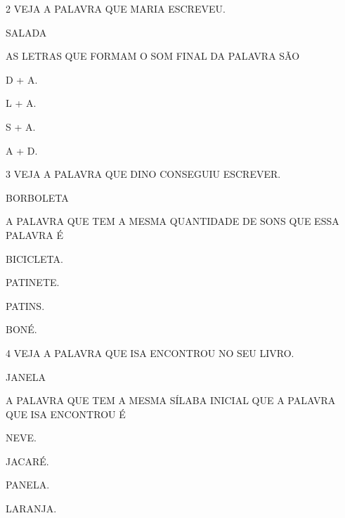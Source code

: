 \num{2} VEJA A PALAVRA QUE MARIA ESCREVEU.

\begin{myquote}
\centering\large{SALADA}
\end{myquote}

AS LETRAS QUE FORMAM O SOM FINAL DA PALAVRA SÃO

\begin{multicols}{2}
\begin{escolha}
\item D + A.

\item L + A.

\item S + A.

\item A + D.
\end{escolha}
\end{multicols}

\num{3} VEJA A PALAVRA QUE DINO CONSEGUIU ESCREVER.

\begin{myquote}
\centering\large{BORBOLETA}
\end{myquote}

A PALAVRA QUE TEM A MESMA QUANTIDADE DE SONS QUE ESSA PALAVRA É 

\begin{multicols}{2}
\begin{escolha}%
\item BICICLETA.

\item PATINETE.

\item PATINS.

\item BONÉ.
\end{escolha}
\end{multicols}

\num{4} VEJA A PALAVRA QUE ISA ENCONTROU NO SEU LIVRO. 

\begin{myquote}
\centering\large{JANELA}
\end{myquote}

A PALAVRA QUE TEM A MESMA SÍLABA INICIAL QUE A PALAVRA QUE ISA ENCONTROU É

\begin{multicols}{2}
\begin{escolha}%
\item NEVE.

\item JACARÉ.

\item PANELA.

\item LARANJA.
\end{escolha}
\end{multicols}

